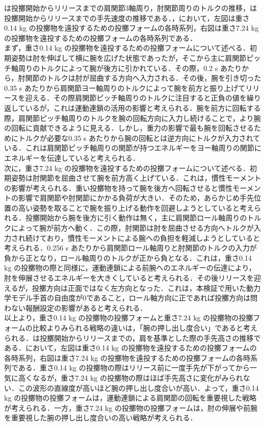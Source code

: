 は投擲開始からリリースまでの肩関節3軸周り，肘関節周りのトルクの推移，は投擲開始からリリースまでの手先速度の推移である．，において，左図は重さ0.14 kg の投擲物を遠投するための投擲フォームの各時系列，右図は重さ7.24 kg の投擲物を遠投するための投擲フォームの各時系列である．\\
まず，重さ0.14 kg の投擲物を遠投するための投擲フォームについて述べる．初期姿勢は肘を伸ばして横に腕を広げた状態であったが，そこから主に肩関節ピッチ軸周りのトルクによって腕が後方に引かれている．その際，0.2 s あたりから，肘関節のトルクは肘が屈曲する方向へ入力される．その後，腕を引き切った0.35 s あたりから肩関節ヨー軸周りのトルクによって腕を前方と振り上げてリリースを迎える．その際肩関節ピッチ軸周りのトルクに注目すると正負の値を繰り返しているが，これは運動連鎖の活用の影響と考えられる．腕を前方に回転する際，肩関節ピッチ軸周りのトルクを腕の回転方向に入力し続けることで，より腕の回転に貢献できるように見える．しかし，重力の影響で最も腕を回転させるためにトルクが必要な0.35 s あたりから腕の回転とは逆方向にトルクが入力されている．これは肩関節ピッチ軸周りの関節が持つエネルギーをヨー軸周りの関節にエネルギーを伝達していると考えられる．\\
次に，重さ7.24 kg の投擲物を遠投するための投擲フォームについて述べる．初期姿勢は肘関節を屈曲させて腕を前方高く上げている．これは，慣性モーメントの影響が考えられる．重い投擲物を持って腕を後方へ回転させると慣性モーメントの影響で肩関節や肘関節にかかる負荷が大きい．そのため，あらかじめ手先位置の高い姿勢を取ることで腕を振り上げる動作を回避しようとしていると考えられる．投擲開始から腕を後方に引く動作は無く，主に肩関節ロール軸周りのトルクによって腕が前方へ動く．この際，肘関節は肘を屈曲させる方向へトルクが入力され続けており，慣性モーメントによる腕への負担を軽減しようとしていると考えられる．0.256 s あたりから肩関節ロール軸周りと肘関節のトルクの入力が負から正となり，ロール軸周りのトルクが正から負となる．これは，重さ0.14 kg の投擲物の際と同様に，運動連鎖による前腕へのエネルギーの伝達により，肘を伸展させるエネルギーを大きくしていると考えられる．その後リリースを迎えるが，投擲方向は正面ではなく左方向となった．これは，本検証で用いた動力学モデル手首の自由度が0であること，ロール軸方向に正であれば投擲方向は問わない報酬設定の影響があると考えられる．\\
以上より，重さ0.14 kg の投擲物の投擲フォームと重さ7.24 kg の投擲物の投擲フォームの比較よりみられる戦略の違いは，「腕の押し出し度合い」であると考えられる．は投擲開始からリリースまでの，肩を基準とした際の手先高さの推移である．において，左図は重さ0.14 kg の投擲物を遠投するための投擲フォームの各時系列，右図は重さ7.24 kg の投擲物を遠投するための投擲フォームの各時系列である．重さ0.14 kg の投擲物の際はリリース前に一度手先が下がってから一気に高くなるが，重さ7.24 kg の投擲物の際はほば手先高さに変化がみられない．この波形の直線度が高いほど腕の押し出し度合いが高い．よって，重さ0.14 kg の投擲物の投擲フォームは，運動連鎖による肩関節の回転を重要視した戦略が考えられる．一方，重さ7.24 kg の投擲物の投擲フォームは，肘の伸展や前腕を重要視した腕の押し出し度合いの高い戦略が考えられる．

